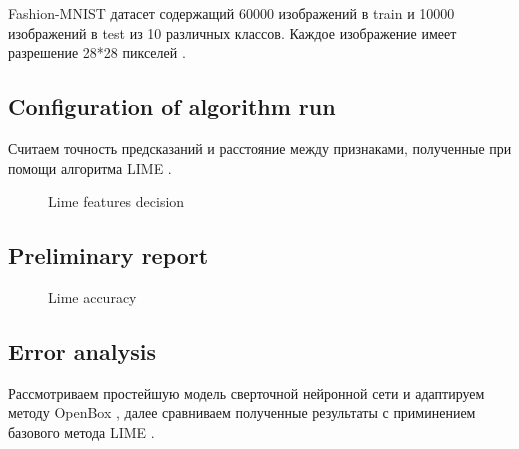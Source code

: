 \documentclass[12pt]{article}
\begin{document}
  Fashion-MNIST датасет содержащий 60000 изображений в train и 10000 изображений в test из 10 различных классов. Каждое изображение имеет разрешение 28*28 пикселей  \citep{fashionmnist}.

\subsection{Configuration of algorithm run}

Считаем точность предсказаний и расстояние между признаками, полученные при помощи алгоритма LIME \cite{ribeiro2016why}.

\begin{figure}
 \caption{Lime features decision}
  \label{fig:1}
\end{figure}

\subsection{Preliminary report}

\begin{figure}
\caption{Lime accuracy}
\label{fig:image}
\end{figure}

\newpage

\subsection{Error analysis}

Рассмотриваем простейшую модель сверточной нейронной сети и адаптируем методу OpenBox \cite{chu2019exact}, далее сравниваем полученные результаты с приминением базового метода LIME \cite{ribeiro2016why}.

\newpage



\end{document}
